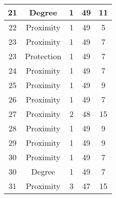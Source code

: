 \documentclass[results.tex]{subfiles}
\begin{document}
\begin{center}
\begin{tabular}{| c || c | c | c | c |}
            \hline
            21                      & Degree                       & 1                      & 49                      & 11                   \\
            \hline
            22                      & Proximity                    & 1                      & 49                      & 5                    \\
            \hline
            23                      & Proximity                    & 1                      & 49                      & 7                    \\
            \hline
            23                      & Protection                   & 1                      & 49                      & 7                    \\
            \hline
            24                      & Proximity                    & 1                      & 49                      & 7                    \\
            \hline
            25                      & Proximity                    & 1                      & 49                      & 9                    \\
            \hline
            26                      & Proximity                    & 1                      & 49                      & 7                    \\
            \hline
            27                      & Proximity                    & 2                      & 48                      & 15                   \\
            \hline
            28                      & Proximity                    & 1                      & 49                      & 9                    \\
            \hline
            29                      & Proximity                    & 1                      & 49                      & 9                    \\
            \hline
            30                      & Proximity                    & 1                      & 49                      & 7                    \\
            \hline
            30                      & Degree                       & 1                      & 49                      & 7                    \\
            \hline
            31                      & Proximity                    & 3                      & 47                      & 15                   \\

\end{tabular}
\end{center}
\end{document}
